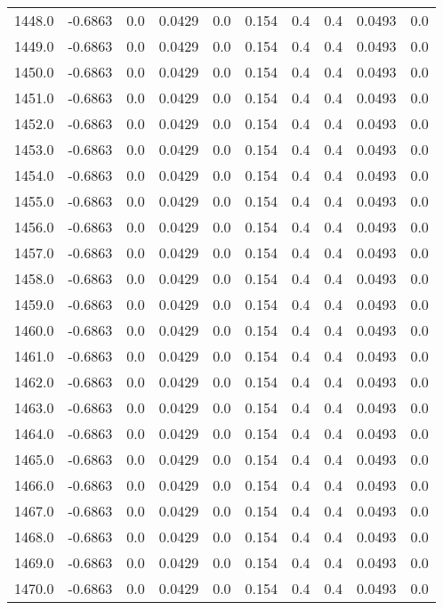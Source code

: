 \begin{longtable}{lrrrrrrrrr}
1448.0 & -0.6863 & 0.0 & 0.0429 & 0.0 & 0.154 & 0.4 & 0.4 & 0.0493 & 0.0 \\
1449.0 & -0.6863 & 0.0 & 0.0429 & 0.0 & 0.154 & 0.4 & 0.4 & 0.0493 & 0.0 \\
1450.0 & -0.6863 & 0.0 & 0.0429 & 0.0 & 0.154 & 0.4 & 0.4 & 0.0493 & 0.0 \\
1451.0 & -0.6863 & 0.0 & 0.0429 & 0.0 & 0.154 & 0.4 & 0.4 & 0.0493 & 0.0 \\
1452.0 & -0.6863 & 0.0 & 0.0429 & 0.0 & 0.154 & 0.4 & 0.4 & 0.0493 & 0.0 \\
1453.0 & -0.6863 & 0.0 & 0.0429 & 0.0 & 0.154 & 0.4 & 0.4 & 0.0493 & 0.0 \\
1454.0 & -0.6863 & 0.0 & 0.0429 & 0.0 & 0.154 & 0.4 & 0.4 & 0.0493 & 0.0 \\
1455.0 & -0.6863 & 0.0 & 0.0429 & 0.0 & 0.154 & 0.4 & 0.4 & 0.0493 & 0.0 \\
1456.0 & -0.6863 & 0.0 & 0.0429 & 0.0 & 0.154 & 0.4 & 0.4 & 0.0493 & 0.0 \\
1457.0 & -0.6863 & 0.0 & 0.0429 & 0.0 & 0.154 & 0.4 & 0.4 & 0.0493 & 0.0 \\
1458.0 & -0.6863 & 0.0 & 0.0429 & 0.0 & 0.154 & 0.4 & 0.4 & 0.0493 & 0.0 \\
1459.0 & -0.6863 & 0.0 & 0.0429 & 0.0 & 0.154 & 0.4 & 0.4 & 0.0493 & 0.0 \\
1460.0 & -0.6863 & 0.0 & 0.0429 & 0.0 & 0.154 & 0.4 & 0.4 & 0.0493 & 0.0 \\
1461.0 & -0.6863 & 0.0 & 0.0429 & 0.0 & 0.154 & 0.4 & 0.4 & 0.0493 & 0.0 \\
1462.0 & -0.6863 & 0.0 & 0.0429 & 0.0 & 0.154 & 0.4 & 0.4 & 0.0493 & 0.0 \\
1463.0 & -0.6863 & 0.0 & 0.0429 & 0.0 & 0.154 & 0.4 & 0.4 & 0.0493 & 0.0 \\
1464.0 & -0.6863 & 0.0 & 0.0429 & 0.0 & 0.154 & 0.4 & 0.4 & 0.0493 & 0.0 \\
1465.0 & -0.6863 & 0.0 & 0.0429 & 0.0 & 0.154 & 0.4 & 0.4 & 0.0493 & 0.0 \\
1466.0 & -0.6863 & 0.0 & 0.0429 & 0.0 & 0.154 & 0.4 & 0.4 & 0.0493 & 0.0 \\
1467.0 & -0.6863 & 0.0 & 0.0429 & 0.0 & 0.154 & 0.4 & 0.4 & 0.0493 & 0.0 \\
1468.0 & -0.6863 & 0.0 & 0.0429 & 0.0 & 0.154 & 0.4 & 0.4 & 0.0493 & 0.0 \\
1469.0 & -0.6863 & 0.0 & 0.0429 & 0.0 & 0.154 & 0.4 & 0.4 & 0.0493 & 0.0 \\
1470.0 & -0.6863 & 0.0 & 0.0429 & 0.0 & 0.154 & 0.4 & 0.4 & 0.0493 & 0.0 \\

\end{longtable}
